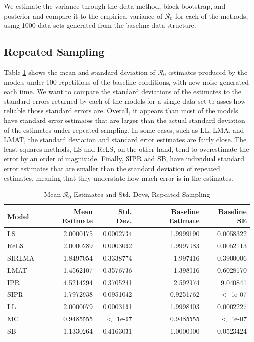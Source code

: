 \documentclass[12pt]{article}
\newcommand{\rr}{\ensuremath{\mathcal{R}_0}}
\begin{document}
We estimate the variance through the delta method, block bootstrap, and posterior and compare it to the empirical variance of $\rr$ for each of the methods, using 1000 data sets generated from the baseline data structure.

\subsection{Repeated Sampling}

Table \ref{tab:rep-samp} shows the mean and standard deviation of $\rr$ estimates produced by the models under 100 repetitions of the baseline conditions, with new noise generated each time. We want to compare the standard deviations of the estimates to the standard errors returned by each of the models for a single data set to asses how reliable those standard errors are. Overall, it appears than most of the models have standard error estimates that are larger than the actual standard deviation of the estimates under repeated sampling. In some cases, such as LL, LMA, and LMAT, the standard deviation and standard error estimates are fairly close. The least squares methods, LS and ReLS, on the other hand, tend to overestimate the error by an order of magnitude. Finally, SIPR and SB, have individual standard error estimates that are smaller than the standard deviation of repeated estimates, meaning that they understate how much error is in the estimates.


\begin{table}[H]
	
	\centering
	\begin{tabular}[t]{l|r|r|r|r}
		\hline
		Model & Mean Estimate & Std. Dev. & Baseline Estimate & Baseline SE\\
		\hline
		LS & 2.0000175 & 0.0002734 & 1.9999190 & 0.0058322\\
		\hline
		ReLS & 2.0000289 & 0.0003092 & 1.9997083 & 0.0052113\\
		\hline
		SIRLMA & 1.8497054 & 0.3338774 & 1.997416 & 0.3900006\\
		\hline
		LMAT & 1.4562107 & 0.3576736 & 1.398016 & 0.6028170 \\
		\hline
		IPR & 4.5214294 & 0.3705241 & 2.592974 & 9.040841\\
		\hline
		SIPR & 1.7972938 & 0.0951042 & 0.9251762 & $<$ 1e-07 \\
		\hline
		LL & 2.0000079 & 0.0003191 & 1.9998403 & 0.0002227\\
		\hline
		MC & 0.9485555 & $<$ 1e-07 & 0.9485555 & $<$ 1e-07\\
		\hline
		SB & 1.1330264 & 0.4163031 & 1.0000000 & 0.0523424\\
		\hline
	\end{tabular}
        \caption{Mean $\rr$ Estimates and Std. Devs, Repeated Sampling}
        \label{tab:rep-samp}
\end{table}
\end{document}
